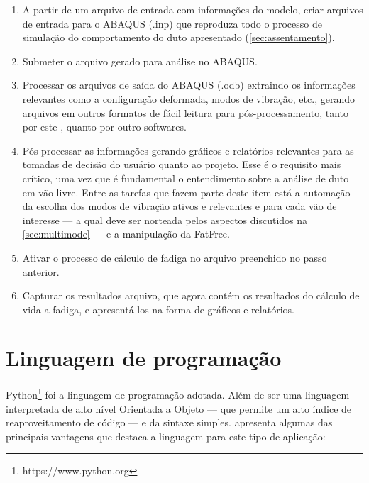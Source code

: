 \begin{enumerate}[label= (\arabic*)]
    \item A partir de um arquivo de entrada com informações do modelo, criar arquivos de entrada para o ABAQUS (.inp) que reproduza todo o processo de simulação do comportamento do duto apresentado (\autoref{sec:assentamento}).
    \item Submeter o arquivo gerado para análise no ABAQUS.
    \item Processar os arquivos de saída do ABAQUS (.odb) extraindo os informações relevantes como a configuração deformada, modos de vibração, etc., gerando arquivos em outros formatos de fácil leitura para pós-processamento, tanto por este \frame, quanto por outro softwares.
    \item Pós-processar as informações gerando gráficos e relatórios relevantes para as tomadas de decisão do usuário quanto ao projeto. Esse é o requisito mais crítico, uma vez que é fundamental o entendimento sobre a análise de duto em vão-livre. Entre as tarefas que fazem parte deste item está a automação da escolha dos modos de vibração ativos e relevantes e para cada vão de interesse --- a qual deve ser norteada pelos aspectos discutidos na \autoref{sec:multimode} --- e a manipulação da FatFree.
    \item Ativar o processo de cálculo de fadiga no arquivo preenchido no passo anterior.
    \item Capturar os resultados arquivo, que agora contém os resultados do cálculo de vida a fadiga, e apresentá-los na forma de gráficos e relatórios.
\end{enumerate}

\section{Linguagem de programação}

Python\footnote{https://www.python.org} foi a linguagem de programação adotada. Além de ser uma linguagem interpretada de alto nível Orientada a Objeto --- que permite um alto índice de reaproveitamento de código --- e da sintaxe simples.  apresenta algumas das principais vantagens que destaca a linguagem para este tipo de aplicação:

